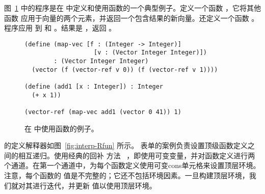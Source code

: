 \documentclass[11pt]{book}
\begin{document}
图~\ref{fig:Rfun-function-example} 中的程序是在 \LangFun{} 中定义和使用函数的一个典型例子。定义一个函数  ，它将其他函数
 应用于向量的两个元素，并返回一个包含结果的新向量。还定义一个函数 。
程序应用
 到  和  。结果是
 ，返回  。

\begin{figure}[tbp]
\begin{lstlisting}
(define (map-vec [f : (Integer -> Integer)]
                   [v : (Vector Integer Integer)])
        : (Vector Integer Integer)
  (vector (f (vector-ref v 0)) (f (vector-ref v 1))))

(define (add1 [x : Integer]) : Integer
  (+ x 1))

(vector-ref (map-vec add1 (vector 0 41)) 1)
\end{lstlisting}
\caption{在 \LangFun{} 中使用函数的例子。}
\label{fig:Rfun-function-example}
\end{figure}

 \LangFun{} 的定义解释器如图~\ref{fig:interp-Rfun} 所示。  表单的案例负责设置顶级函数定义之间的相互递归。使用经典的回补
方法~\citep{Kelsey:1998di} ，即使用可变变量，并对函数定义进行两个通道。在第一个通道中，为每个函数定义使用可变cons单元格来设置顶层环境。注意，每个函数的  值是不完整的；它还不包括环境因素。一旦构建顶层环境，我们就对其进行迭代，并更新  值以使用顶层环境。
\end{document}
